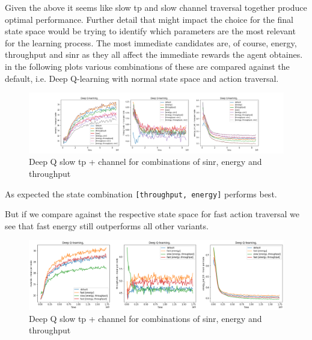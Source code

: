 

Given the above it seems like 
slow tp and slow channel traversal together produce optimal performance. 
Further detail that might impact the 
choice for the final state space would
be trying to identify which parameters
are the most relevant for the learning
process. The most immediate candidates
are, of course, energy, throughput
and sinr as they all affect the 
immediate rewards the agent obtaines.
in the following plots various 
combinations of these are compared
against the default, i.e. Deep Q-learning with normal state space
and action traversal.

\begin{figure}[H]
\centering
\hspace*{-3.3cm}  
\includegraphics[scale=0.40]{plots/slow_action/energy_throughput.png}
  \caption{Deep Q slow tp + channel for combinations of sinr, energy and throughput}
\end{figure}

As expected the state combination \texttt{[throughput, energy]} performs
best.

But if we compare against the respective
state space for fast action traversal we 
see that fast energy still outperforms 
all other variants. 

\begin{figure}[H]
\centering
\hspace*{-1.3cm}  
\includegraphics[scale=0.40]{plots/slow_action/throughput_energy_small.png}
  \caption{Deep Q slow tp + channel for combinations of sinr, energy and throughput}
\end{figure}

